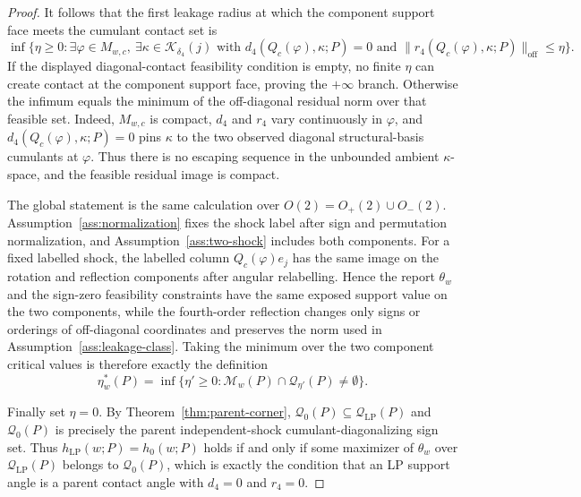 \begin{proof}
It follows that the first leakage radius at which the component support face meets the cumulant contact set is
\[
\inf\{\eta\ge0:
\exists \varphi\in M_{w,c},\ \exists\kappa\in\mathcal K_{\delta_4}(j)
\text{ with }d_4(Q_c(\varphi),\kappa;P)=0
\text{ and }\|r_4(Q_c(\varphi),\kappa;P)\|_{\mathrm{off}}\le\eta\}.
\]
If the displayed diagonal-contact feasibility condition is empty, no finite \(\eta\) can create contact at the component support face, proving the \(+\infty\) branch.  Otherwise the infimum equals the minimum of the off-diagonal residual norm over that feasible set.  Indeed, \(M_{w,c}\) is compact, \(d_4\) and \(r_4\) vary continuously in \(\varphi\), and \(d_4(Q_c(\varphi),\kappa;P)=0\) pins \(\kappa\) to the two observed diagonal structural-basis cumulants at \(\varphi\).  Thus there is no escaping sequence in the unbounded ambient \(\kappa\)-space, and the feasible residual image is compact.

The global statement is the same calculation over \(O(2)=O_+(2)\cup O_-(2)\).  Assumption~\ref{ass:normalization} fixes the shock label after sign and permutation normalization, and Assumption~\ref{ass:two-shock} includes both components.  For a fixed labelled shock, the labelled column \(Q_c(\varphi)e_j\) has the same image on the rotation and reflection components after angular relabelling.  Hence the report \(\theta_w\) and the sign-zero feasibility constraints have the same exposed support value on the two components, while the fourth-order reflection changes only signs or orderings of off-diagonal coordinates and preserves the norm used in Assumption~\ref{ass:leakage-class}.  Taking the minimum over the two component critical values is therefore exactly the definition
\[
\eta_w^*(P)=
\inf\{\eta'\ge0:\mathcal M_w(P)\cap\mathcal Q_{\eta'}(P)\ne\emptyset\}.
\]

Finally set \(\eta=0\).  By Theorem~\ref{thm:parent-corner}, \(\mathcal Q_0(P)\subseteq\mathcal Q_{\mathrm{LP}}(P)\) and \(\mathcal Q_0(P)\) is precisely the parent independent-shock cumulant-diagonalizing sign set.  Thus \(h_{\mathrm{LP}}(w;P)=h_0(w;P)\) holds if and only if some maximizer of \(\theta_w\) over \(\mathcal Q_{\mathrm{LP}}(P)\) belongs to \(\mathcal Q_0(P)\), which is exactly the condition that an LP support angle is a parent contact angle with \(d_4=0\) and \(r_4=0\).


\end{proof}

